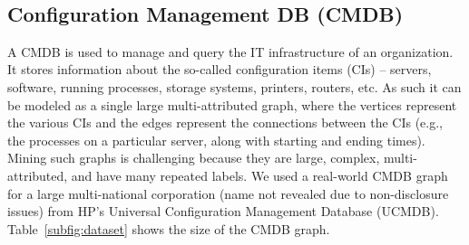 \begin{table}[!h]
\centering
{} \\
  \caption{ \protect{}: Input graph statistics, 
    \protect{}: Maximal pattern statistics (the numbers
    shown are average values).
  }
  \label{fig:stats}
\end{table}

\subsection{Configuration Management DB (CMDB)} 

A CMDB is used to manage and query the IT infrastructure of an
organization. It stores information about the so-called configuration
items (CIs) -- servers, software, running processes, storage systems,
printers, routers, etc. As such it can be modeled as a single large
multi-attributed graph, where the vertices represent the various CIs and
the edges represent the connections between the CIs (e.g., the processes
on a particular server, along with starting and ending times).  Mining
such graphs is challenging because they are large, complex,
multi-attributed, and have many repeated labels.  We used a real-world
CMDB graph for a large multi-national corporation (name not revealed due
to non-disclosure issues) from HP's Universal Configuration Management
Database (UCMDB).  Table~\ref{subfig:dataset} shows the size of the CMDB
graph. 


